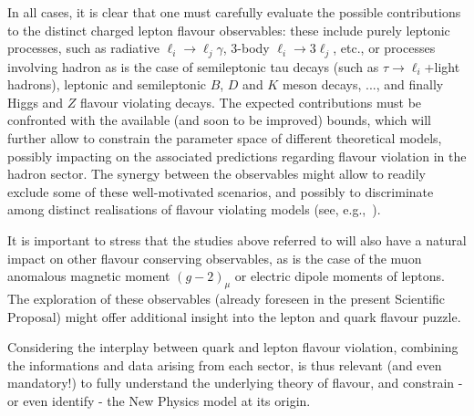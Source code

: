 In all cases, it is clear that one must 
carefully evaluate the possible contributions to the
distinct charged lepton flavour observables: these include 
purely leptonic processes, such as 
radiative $\ell_i \to \ell_j \gamma$, 3-body $\ell_i \to 3\ell_j$,
etc., or processes involving hadron as is the case of semileptonic 
tau decays (such as $\tau \to \ell_i$+light hadrons), leptonic and 
semileptonic $B$, $D$
and $K$ meson decays, ..., and finally Higgs and $Z$ flavour violating
decays.
The expected contributions must be 
confronted with the available (and soon to
be improved) bounds, which will further allow to constrain the
parameter space of different theoretical models, possibly
impacting on the associated predictions regarding flavour
violation in the hadron sector. 
The synergy between the observables might allow to 
readily exclude some of these well-motivated scenarios, and 
possibly to discriminate among distinct realisations of 
flavour violating models 
(see, e.g.,~\cite{Abada:2014cca,Abada:2015zea,Abada:2015oba}). 

\medskip
It is important to stress that the
studies above referred to 
will also have a natural impact on other flavour conserving 
observables, as is the case of the muon anomalous magnetic moment
$(g-2)_\mu$ 
or electric dipole moments of leptons. The exploration of these observables
(already foreseen in the present Scientific Proposal) might offer 
additional insight into the lepton and quark flavour puzzle.


\medskip
Considering the interplay between quark and lepton flavour
violation, combining the informations and data arising from each
sector, is thus relevant (and even mandatory!) to fully understand 
the underlying theory of flavour, and constrain - or even identify -
the New Physics model at its origin. 





